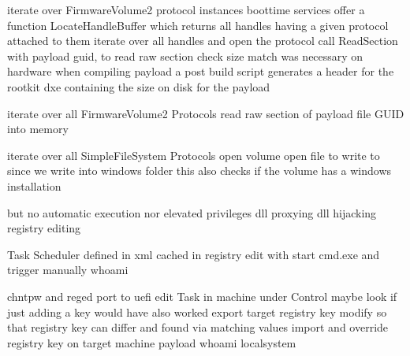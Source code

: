 iterate over FirmwareVolume2 protocol instances
boottime services offer a function LocateHandleBuffer which returns all handles having a given protocol attached to them
iterate over all handles and open the protocol
call ReadSection with payload guid, to read raw section
check size match was necessary on hardware
when compiling payload a post build script generates a header for the rootkit dxe containing the size on disk for the payload

iterate over all FirmwareVolume2 Protocols
read raw section of payload file GUID into memory

iterate over all SimpleFileSystem Protocols
open volume
open file to write to
since we write into windows folder this also checks if the volume has a windows installation


but no automatic execution nor elevated privileges
dll proxying
dll hijacking
registry editing

Task Scheduler
defined in xml
cached in registry
edit with start cmd.exe and trigger manually
whoami

chntpw and reged
\cite{chntpw}
port to uefi
edit Task in machine under Control
maybe look if just adding a key would have also worked
export target registry key
modify so that registry key can differ and found via matching values
import and override registry key on target machine
payload whoami
localsystem

